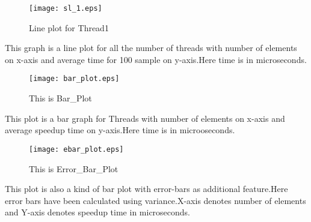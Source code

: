 \documentclass[a4paper, 10pt]{report}
\begin{document}
\newpage
\begin{figure}
\centering

\texttt{[image: sl\_1.eps]}
 \caption{Line plot for Thread1}
 \label{fig:sl_1}
\end{figure}
This graph is a line plot for all the number of threads with number of elements on x-axis and average time for 100 sample on y-axis.Here time is in microseconds.
\newpage
\begin{figure}
\texttt{[image: bar\_plot.eps]}
 \caption{This is Bar\_Plot}
 \label{fig:bar}
\end{figure}
This plot is a bar graph for Threads with number of elements on x-axis and average speedup time on y-axis.Here time is in microoseconds.
\newpage
\begin{figure}
\texttt{[image: ebar\_plot.eps]}
 \caption{This is Error\_Bar\_Plot}
 \label{fig:error_bar}
\end{figure}
This plot is also a kind of bar plot with error-bars as additional feature.Here error bars have been calculated using variance.X-axis denotes number of elements and Y-axis denotes speedup time in microseconds. 
\end{document}
